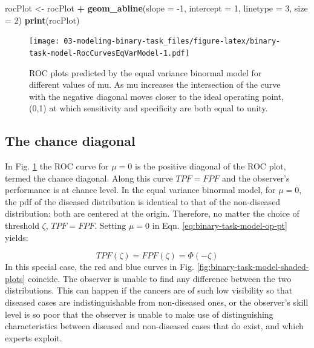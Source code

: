 \documentclass[
]{book}
\newenvironment{Shaded}{\begin{snugshade}}{\end{snugshade}}
\newcommand{\DataTypeTok}[1]{\textcolor[rgb]{0.13,0.29,0.53}{#1}}
\newcommand{\DecValTok}[1]{\textcolor[rgb]{0.00,0.00,0.81}{#1}}
\newcommand{\KeywordTok}[1]{\textcolor[rgb]{0.13,0.29,0.53}{\textbf{#1}}}
\newcommand{\NormalTok}[1]{#1}
\newcommand{\OperatorTok}[1]{\textcolor[rgb]{0.81,0.36,0.00}{\textbf{#1}}}
\newcommand{\StringTok}[1]{\textcolor[rgb]{0.31,0.60,0.02}{#1}}
\begin{document}
\begin{Shaded}
\begin{Highlighting}[]
\NormalTok{rocPlot <-}\StringTok{ }\NormalTok{rocPlot }\OperatorTok{+}\StringTok{ }
\StringTok{  }\KeywordTok{geom_abline}\NormalTok{(}\DataTypeTok{slope =} \DecValTok{-1}\NormalTok{, }
              \DataTypeTok{intercept =} \DecValTok{1}\NormalTok{, }
              \DataTypeTok{linetype =} \DecValTok{3}\NormalTok{,}
              \DataTypeTok{size =} \DecValTok{2}\NormalTok{)}
\KeywordTok{print}\NormalTok{(rocPlot)}
\end{Highlighting}
\end{Shaded}

\begin{figure}
\centering
\texttt{[image: 03-modeling-binary-task\_files/figure-latex/binary-task-model-RocCurvesEqVarModel-1.pdf]}
\caption{\label{fig:binary-task-model-RocCurvesEqVarModel}ROC plots predicted by the equal variance binormal model for different values of mu. As mu increases the intersection of the curve with the negative diagonal moves closer to the ideal operating point, (0,1) at which sensitivity and specificity are both equal to unity.}
\end{figure}

\hypertarget{binary-task-model-chance-diagonal}{%
\subsection{The chance diagonal}\label{binary-task-model-chance-diagonal}}

In Fig. \ref{fig:binary-task-model-RocCurvesEqVarModel} the ROC curve for \(\mu=0\) is the positive diagonal of the ROC plot, termed the chance diagonal. Along this curve \(TPF = FPF\) and the observer's performance is at chance level. In the equal variance binormal model, for \(\mu=0\), the pdf of the diseased distribution is identical to that of the non-diseased distribution: both are centered at the origin. Therefore, no matter the choice of threshold \(\zeta\), \(TPF = FPF\). Setting \(\mu=0\) in Eqn. \eqref{eq:binary-task-model-op-pt} yields:

\[TPF\left ( \zeta \right )=FPF\left ( \zeta \right )=\Phi\left ( -\zeta \right )\]
In this special case, the red and blue curves in Fig. \ref{fig:binary-task-model-shaded-plots} coincide. The observer is unable to find any difference between the two distributions. This can happen if the cancers are of such low visibility so that diseased cases are indistinguishable from non-diseased ones, or the observer's skill level is so poor that the observer is unable to make use of distinguishing characteristics between diseased and non-diseased cases that do exist, and which experts exploit.
\end{document}
